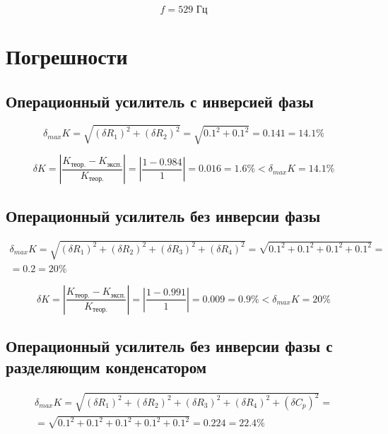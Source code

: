 \begin{displaymath}
	f = 529 \text{ Гц}
\end{displaymath}


\section{Погрешности}

\subsection{Операционный усилитель с инверсией фазы}

\begin{displaymath}
	\delta_{max} K = \sqrt{(\delta R_1)^2 + (\delta R_2)^2} =  \sqrt{0.1^2 + 0.1^2} = 0.141 = 14.1 \%
\end{displaymath}

\begin{displaymath}
	\delta K = \left|\frac{K_\text{теор.} - K_\text{эксп.}}{K_\text{теор.}} \right| = \left|\frac{1 - 0.984}{1}\right| = 0.016 = 1.6\% < \delta_{max} K = 14.1\%
\end{displaymath}

\subsection{Операционный усилитель без инверсии фазы}

\begin{displaymath}
\begin{aligned}
	\delta_{max} K = \sqrt{(\delta R_1)^2 + (\delta R_2)^2 + (\delta R_3)^2 + (\delta R_4)^2} = \sqrt{0.1^2 + 0.1^2 + 0.1^2 + 0.1^2} = \\ = 0.2 = 20 \%
\end{aligned}
\end{displaymath}

\begin{displaymath}
	\delta K = \left|\frac{K_\text{теор.} - K_\text{эксп.}}{K_\text{теор.}} \right| = \left|\frac{1 - 0.991}{1}\right| = 0.009 = 0.9\% < \delta_{max} K = 20\%
\end{displaymath}

\subsection{Операционный усилитель без инверсии фазы с разделяющим конденсатором}

\begin{displaymath}
\begin{aligned}
	\delta_{max} K = \sqrt{(\delta R_1)^2 + (\delta R_2)^2 + (\delta R_3)^2 + (\delta R_4)^2 + (\delta C_p)^2} = \\ = \sqrt{0.1^2 + 0.1^2 + 0.1^2 + 0.1^2 + 0.1^2} = 0.224 = 22.4 \%
\end{aligned}
\end{displaymath}

